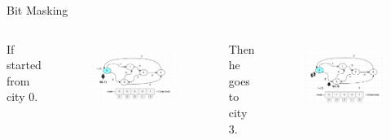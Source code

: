 \documentclass{beamer}
\begin{document}
\begin{frame}{Bit Masking}
    \begin{columns}
            If started from city 0. 
             \pause
            \begin{figure}[h]
        	\centering
        	\includegraphics[scale=0.4]{s1.png}
        	\label{fig:1}
            \end{figure}
        \pause
            Then he goes to city 3.
             \pause
            \begin{figure}[h]
        	\centering
        	\includegraphics[scale=0.4]{s2.png}
        	\label{fig:2}
            \end{figure}
    \end{columns}
\end{frame}
\end{document}
